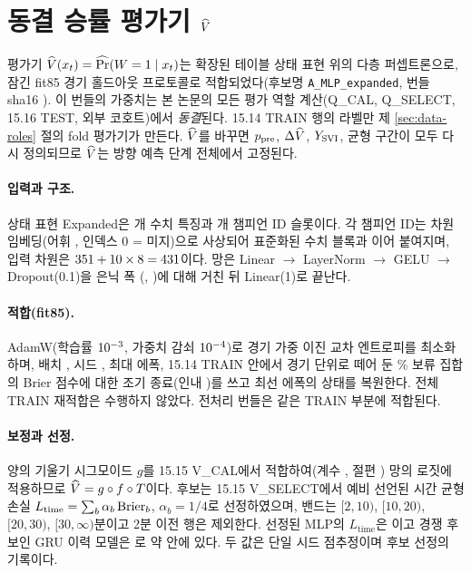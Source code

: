 \section{동결 승률 평가기 $\widehat V$}
\label{sec:value-evaluator}

평가기 $\widehat V(x_t) = \widehat{\Pr}(W = 1 \mid x_t)$는 확장된 테이블 상태 표현 위의 다층 퍼셉트론으로, 잠긴 fit85 경기 홀드아웃 프로토콜로 적합되었다(후보명 \texttt{A\_MLP\_expanded}, 번들 sha16 \texttt{\bundleSha}). 이 번들의 가중치는 본 논문의 모든 평가 역할 계산(Q\_CAL, Q\_SELECT, 15.16 TEST, 외부 코호트)에서 \emph{동결}된다. 15.14 TRAIN 행의 라벨만 제 \ref{sec:data-roles} 절의 fold 평가기가 만든다. $\widehat V$를 바꾸면 $p_{\mathrm{pre}}$, $\Delta\widehat V$, $Y_{\mathrm{SVI}}$, 균형 구간이 모두 다시 정의되므로 $\widehat V$는 방향 예측 단계 전체에서 고정된다.

\paragraph{입력과 구조.} 상태 표현 Expanded\dimExpanded{}은 \dimNumeric{}개 수치 특징과 \dimChampSlots{}개 챔피언 ID 슬롯이다. 각 챔피언 ID는 \dimEmbed{}차원 임베딩(어휘 \vocabChamp{}, 인덱스 0 = 미지)으로 사상되어 표준화된 수치 블록과 이어 붙여지며, 입력 차원은 $351 + 10 \times 8 = 431$이다. 망은 Linear $\to$ LayerNorm $\to$ GELU $\to$ Dropout(0.1)을 은닉 폭 (\hiddenA, \hiddenB)에 대해 거친 뒤 Linear(1)로 끝난다.

\paragraph{적합(fit85).} AdamW(학습률 $10^{-3}$, 가중치 감쇠 $10^{-4}$)로 경기 가중 이진 교차 엔트로피를 최소화하며, 배치 \batchV, 시드 \bootSeed, 최대 \maxEpochsV{} 에폭, 15.14 TRAIN 안에서 경기 단위로 떼어 둔 \holdoutV\% 보류 집합의 Brier 점수에 대한 조기 종료(인내 \patienceV)를 쓰고 최선 에폭의 상태를 복원한다. 전체 TRAIN 재적합은 수행하지 않았다. 전처리 번들은 같은 TRAIN 부분에 적합된다.

\paragraph{보정과 선정.} 양의 기울기 시그모이드 $g$를 15.15 V\_CAL에서 적합하여(계수 \calibCoef, 절편 \calibIntercept) 망의 로짓에 적용하므로 $\widehat V = g \circ f \circ T$이다. 후보는 15.15 V\_SELECT에서 예비 선언된 시간 균형 손실 $L_{\mathrm{time}} = \sum_b \alpha_b \operatorname{Brier}_b$, $\alpha_b = 1/4$로 선정하였으며, 밴드는 $[2,10)$, $[10,20)$, $[20,30)$, $[30,\infty)$분이고 2분 이전 행은 제외한다. 선정된 MLP의 $L_{\mathrm{time}}$은 \LtimeMLP{}이고 경쟁 후보인 GRU 이력 모델은 \LtimeGRU{}로 약 \gruGap{} 안에 있다. 두 값은 단일 시드 점추정이며 후보 선정의 기록이다.
